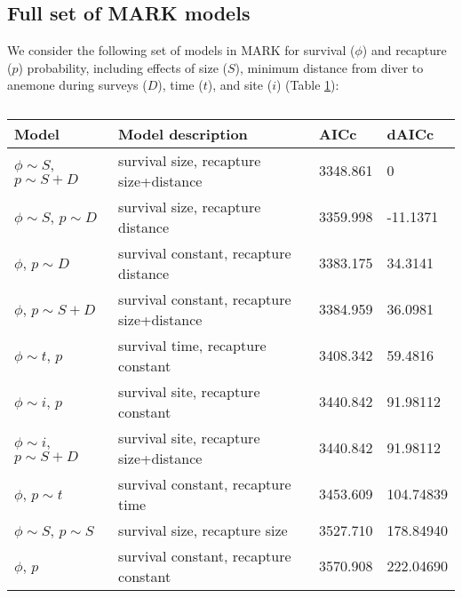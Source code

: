 \documentclass[12pt, oneside]{article}   	%
\begin{document}
\newpage{}

\subsection{Full set of MARK models} \label{APP_MARKModels}
We consider the following set of models in MARK for survival ($\phi$) and recapture ($p$) probability, including effects of size ($S$), minimum distance from diver to anemone during surveys ($D$), time ($t$), and site ($i$) (Table \ref{APP_TAB_MARKmodels}):

\begin{table}
\begin{centering}
\begin{tabular}{|p{2in}|p{2.5in}|p{0.75in}|p{0.75in}|}
\hline 
\textbf{Model} & \textbf{Model description} & \textbf{AICc} & \textbf{dAICc} \\ \hline
$\phi \sim S$, $p \sim S+D$ & survival size, recapture size+distance & 3348.861 & 0 \\ \hline
$\phi \sim S$, $p \sim D$ & survival size, recapture distance & 3359.998 & -11.1371 \\ \hline
$\phi$, $p \sim D$ & survival constant, recapture distance & 3383.175 & 34.3141 \\ \hline
$\phi$, $p \sim S+D$ & survival constant, recapture size+distance & 3384.959 & 36.0981 \\ \hline
$\phi \sim t$, $p$ & survival time, recapture constant & 3408.342 & 59.4816 \\ \hline
$\phi \sim i$, $p$ & survival site, recapture constant & 3440.842 & 91.98112 \\ \hline
$\phi \sim i$, $p \sim S+D$ & survival site, recapture size+distance & 3440.842 & 91.98112 \\ \hline
$\phi$, $p \sim t$ & survival constant, recapture time & 3453.609 & 104.74839 \\ \hline
$\phi \sim S$, $p \sim S$ & survival size, recapture size & 3527.710 & 178.84940 \\ \hline
$\phi$, $p$ & survival constant, recapture constant & 3570.908 & 222.04690 \\ \hline
\end{tabular}
\end{centering}
\caption{}\label{APP_TAB_MARKmodels}
\end{table}


\end{document}
